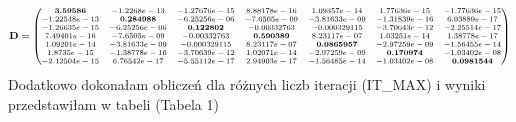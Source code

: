 \documentclass{article}
\begin{document}
\begin{equation}
\textbf{D} = 
	\scriptsize
	\begin{pmatrix}
	\textbf{3.59586} & -1.2268e-13 & -1.27676e-15 & 8.88178e-16 & 1.09357e-14 & 1.77636e-15 & -1.77636e-15 \\
	-1.22548e-13 & \textbf{0.284988} & -6.25256e-06 & -7.6505e-09 & -3.81633e-09 & -1.31839e-16 & 6.93889e-17\\
	-1.26635e-15 & -6.25256e-06 & \textbf{0.122802} & -0.00332763 & -0.000329115 & -3.70643e-12 & -2.25514e-17\\ 
	7.49401e-16 & -7.6505e-09 & -0.00332763 & \textbf{0.590389} & 8.23117e-07 & 1.03251e-14 & 1.38778e-17\\ 
	1.09201e-14 & -3.81633e-09 & -0.000329115 & 8.23117e-07 & \textbf{0.0865957} & -2.97259e-09 & -1.56455e-14\\ 
	1.8735e-15 & -1.38778e-16 & -3.70639e-12 & 1.02071e-14 & -2.97259e-09 & \textbf{0.170974} & -1.03402e-08\\ 
	-2.12504e-15 & 6.76542e-17 & -5.55112e-17 & 2.94903e-17 & -1.56485e-14 & -1.03402e-08 & \textbf{0.0981544} 
	\end{pmatrix}
\end{equation}
\normalsize
Dodatkowo dokonałam obliczeń dla różnych liczb iteracji (IT\_MAX) i wyniki przedstawiłam w tabeli (Tabela 1)\\
\end{document}
